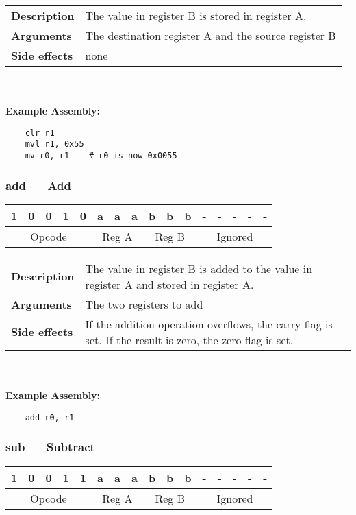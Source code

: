 \documentclass[titlepage]{article}
\begin{document}
\begin{tabular}{l p{8cm}}
{\bf Description} & The value in register B is stored in register A. \\
{\bf Arguments} & The destination register A and the source register B \\
{\bf Side effects} & none \\
\end{tabular}\\ \\
{\bf Example Assembly:}
\begin{verbatim}
    clr r1
    mvl r1, 0x55
    mv r0, r1    # r0 is now 0x0055
\end{verbatim}

\subsubsection{add --- Add}\begin{center}
\begin{tabular}{|c|c|c|c|c|c|c|c|c|c|c|c|c|c|c|c|}
\hline
1 & 0 & 0 & 1 & 0 & a & a & a & b & b & b & - & - & - & - & - \\
\hline
\multicolumn{5}{|c}{Opcode} &
\multicolumn{3}{|c}{Reg A} &
\multicolumn{3}{|c}{Reg B} &
\multicolumn{5}{|c|}{Ignored} \\
\hline
\end{tabular}
\end{center}

\begin{tabular}{l p{8cm}}
{\bf Description} & The value in register B is added to the value in register A and stored in register A. \\
{\bf Arguments} & The two registers to add \\
{\bf Side effects} & If the addition operation overflows, the carry flag is set. If the result is zero, the zero flag is set. \\
\end{tabular}\\ \\
{\bf Example Assembly:}
\begin{verbatim}
    add r0, r1
\end{verbatim}

\subsubsection{sub --- Subtract}\begin{center}
\begin{tabular}{|c|c|c|c|c|c|c|c|c|c|c|c|c|c|c|c|}
\hline
1 & 0 & 0 & 1 & 1 & a & a & a & b & b & b & - & - & - & - & - \\
\hline
\multicolumn{5}{|c}{Opcode} &
\multicolumn{3}{|c}{Reg A} &
\multicolumn{3}{|c}{Reg B} &
\multicolumn{5}{|c|}{Ignored} \\
\hline
\end{tabular}
\end{center}
\end{document}
